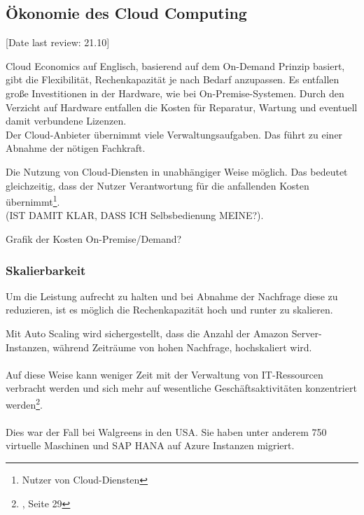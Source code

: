 \subsection{Ökonomie des Cloud Computing}\label{subsec_UabsGrund3}
[Date last review: 21.10]
\begin{flushleft}
      {
            Cloud Economics auf Englisch, basierend auf dem On-Demand Prinzip basiert,
            gibt die Flexibilität, Rechenkapazität je nach Bedarf anzupassen.
            Es entfallen große Investitionen in der Hardware, wie bei On-Premise-Systemen.
            Durch den Verzicht auf Hardware entfallen die Kosten für Reparatur, Wartung und eventuell damit verbundene Lizenzen. 
            \\
            Der Cloud-Anbieter übernimmt viele Verwaltungsaufgaben. Das führt zu einer Abnahme der nötigen Fachkraft.
            {\cite{IDC01}}


           Die Nutzung von Cloud-Diensten in unabhängiger Weise möglich. 
           Das bedeutet gleichzeitig, dass der Nutzer Verantwortung für die anfallenden Kosten übernimmt\footnote{Nutzer von Cloud-Diensten}.
           \\(IST DAMIT KLAR, DASS ICH Selbsbedienung MEINE?). }
\end{flushleft}

Grafik der Kosten On-Premise/Demand?

\subsubsection{Skalierbarkeit}
Um die Leistung aufrecht zu halten und bei Abnahme der Nachfrage diese zu reduzieren,  ist es möglich die Rechenkapazität hoch und runter zu skalieren.

Mit Auto Scaling wird sichergestellt, dass die Anzahl der Amazon Server-Instanzen, während Zeiträume von hohen Nachfrage, hochskaliert wird.
\\\\
Auf diese Weise kann weniger Zeit mit der Verwaltung von IT-Ressourcen verbracht werden und sich mehr auf wesentliche Geschäftsaktivitäten konzentriert werden\footnote{{\cite{AWS1}}, Seite 29}.
\\\\
Dies war der Fall bei Walgreens in den USA.
Sie haben unter anderem 750 virtuelle Maschinen und SAP HANA auf Azure Instanzen migriert.

